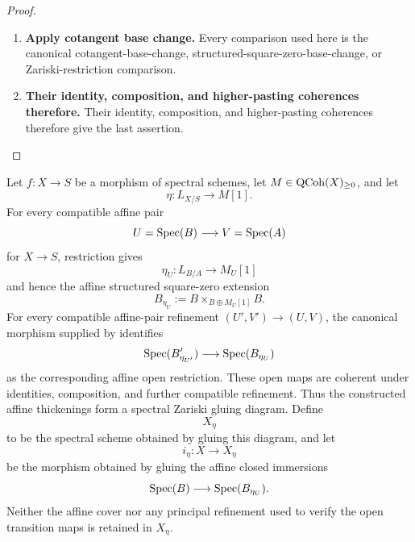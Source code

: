 \begin{proof}
\begin{enumerate}[label=\textup{(\arabic*)}]
    \item \textbf{Apply cotangent base change.}
    Every comparison used here is the canonical cotangent-base-change,
    structured-square-zero-base-change, or Zariski-restriction comparison.

    \item \textbf{Their identity, composition, and higher-pasting coherences therefore.}
    Their identity, composition, and higher-pasting coherences therefore give the last
    assertion.
\end{enumerate}
\end{proof}

\begin{construction}
\label{con:global-structured-infinitesimal-extension}
Let \(f:X\to S\) be a morphism of spectral schemes, let
\(M\in\operatorname{QCoh}(X)_{\geq0}\), and let
\[
    \eta:L_{X/S}\longrightarrow M[1].
\]
For every compatible affine pair
\[
    U=\operatorname{Spec}(B)\longrightarrow V=\operatorname{Spec}(A)
\]
for \(X\to S\), restriction gives
\[
    \eta_U:L_{B/A}\longrightarrow M_U[1]
\]
and hence the affine structured square-zero extension
\[
    B_{\eta_U}
    :=
    B\times_{B\oplus M_U[1]}B.
\]
For every compatible affine-pair refinement
\((U',V')\to(U,V)\), the canonical morphism supplied by
 identifies
\[
    \operatorname{Spec}(B'_{\eta_{U'}})
    \longrightarrow
    \operatorname{Spec}(B_{\eta_U})
\]
as the corresponding affine open restriction. These open maps are coherent
under identities, composition, and further compatible refinement. Thus the constructed affine thickenings form a
spectral Zariski gluing diagram. Define
\[
    X_\eta
\]
to be the spectral scheme obtained by gluing this diagram, and let
\[
    i_\eta:X\longrightarrow X_\eta
\]
be the morphism obtained by gluing the affine closed immersions
\[
    \operatorname{Spec}(B)\longrightarrow\operatorname{Spec}(B_{\eta_U}).
\]
Neither the affine cover nor any principal refinement used to verify the open
transition maps is retained in \(X_\eta\).
\end{construction}

